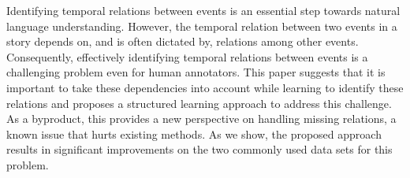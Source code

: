 Identifying temporal relations between events is an essential step towards natural language understanding. However, the temporal relation between two events in a story depends on, and is often dictated by, relations among other events. Consequently, effectively identifying temporal relations between events is a challenging problem even for human annotators. This paper suggests that it is important to take these dependencies into account while learning to identify these relations and proposes a structured learning approach to address this challenge. As a byproduct, this provides a new perspective on handling missing relations, a known issue that hurts existing methods. As we show, the proposed approach results in significant improvements on the two commonly used data sets for this problem.
